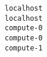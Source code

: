 \begin{lstlisting}[frame=single]
localhost
localhost
compute-0
compute-0
compute-1
\end{lstlisting}

